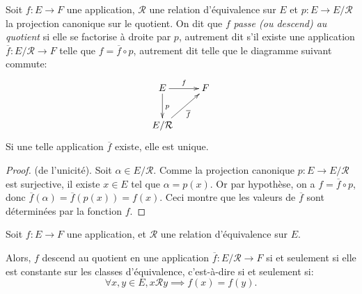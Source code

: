\begin{propdef}
Soit $f : E\to F$ une application, $\mathcal R$ une relation d'équivalence sur $E$  et $p : E\to E/\mathcal R$ la projection canonique sur le quotient.
On dit que $f$ \emph{passe (ou descend) au quotient} si elle se factorise à droite par $p$, autrement dit s'il existe une application $\overline f : E/\mathcal R\to F$ telle que $f = \overline{f} \circ p$, autrement dit telle que le diagramme suivant commute:
\[
\xymatrix{
E \ar[r]^f \ar[d]^p & F\\
E/\mathcal R \ar[ur]_{\overline f}& 
}
\] 
Si une telle application $\overline{f}$ existe, elle est unique.
\end{propdef}
\begin{proof}(de l'unicité). Soit $\alpha \in E/\mathcal R$. Comme la projection canonique $p : E\to E/\mathcal R$ est surjective, il existe $x\in E$ tel que $\alpha=p(x)$. Or par hypothèse, on a $f = \overline{f} \circ p$, donc $\overline f(\alpha) =\overline f(p(x))= f(x)$. Ceci montre que les valeurs de $\overline f$ sont déterminées par la fonction $f$.
\end{proof}


\begin{proposition}
Soit $f : E\to F$ une application, et $\mathcal R$ une relation d'équivalence sur $E$.

Alors, $f$ descend au quotient en une application $\overline f : E/\mathcal R \to F$ si et seulement si elle est constante sur les classes d'équivalence, c'est-à-dire si et seulement si:
\[
\forall x,y\in E, x\mathcal R y \implies f(x)=f(y).
\]
\end{proposition}




